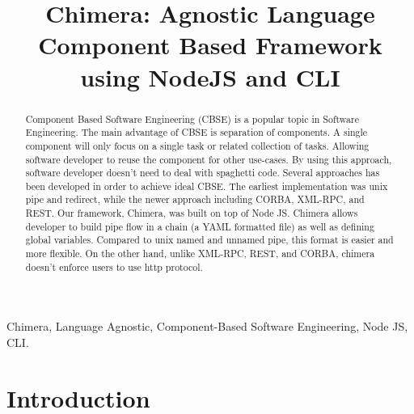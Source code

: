 \documentclass[conference]{IEEEtran}
\begin{document}
\title{Chimera: Agnostic Language Component Based Framework using NodeJS and CLI}

\author{
\and
{}
\and
{}
}

\maketitle


\begin{abstract}
    Component Based Software Engineering (CBSE) is a popular topic in Software Engineering. The main advantage of CBSE is separation of components. A single component will only focus on a single task or related collection of tasks. Allowing software developer to reuse the component for other use-cases. By using this approach, software developer doesn't need to deal with spaghetti code. Several approaches has been developed in order to achieve ideal CBSE. The earliest implementation was unix pipe and redirect, while the newer approach including CORBA, XML-RPC, and REST. Our framework, Chimera, was built on top of Node JS. Chimera allows developer to build pipe flow in a chain (a YAML formatted file) as well as defining global variables. Compared to unix named and unnamed pipe, this format is easier and more flexible. On the other hand, unlike XML-RPC, REST, and CORBA, chimera doesn't enforce users to use http protocol.
\end{abstract}

\begin{IEEEkeywords}
Chimera, Language Agnostic, Component-Based Software Engineering, Node JS, CLI.
\end{IEEEkeywords}

\IEEEpeerreviewmaketitle



\section{Introduction}
\blindtext
\cite{def:feilhauer}
\end{document}
